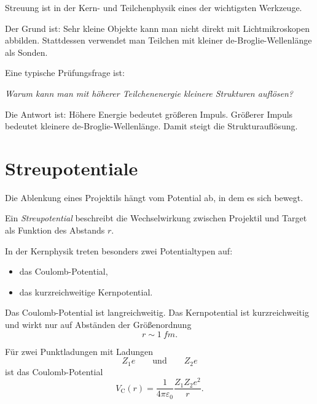 \begin{conceptbox}
Streuung ist in der Kern- und Teilchenphysik eines der wichtigsten Werkzeuge.

Der Grund ist:
Sehr kleine Objekte kann man nicht direkt mit Lichtmikroskopen abbilden.
Stattdessen verwendet man Teilchen mit kleiner de-Broglie-Wellenlänge als Sonden.
\end{conceptbox}

\begin{examtipbox}
Eine typische Prüfungsfrage ist:
\begin{center}
\emph{Warum kann man mit höherer Teilchenenergie kleinere Strukturen auflösen?}
\end{center}
Die Antwort ist:
Höhere Energie bedeutet größeren Impuls.
Größerer Impuls bedeutet kleinere de-Broglie-Wellenlänge.
Damit steigt die Strukturauflösung.
\end{examtipbox}

\section{Streupotentiale}

Die Ablenkung eines Projektils hängt vom Potential ab, in dem es sich bewegt.

\begin{definitionbox}
Ein \emph{Streupotential} beschreibt die Wechselwirkung zwischen Projektil und Target
als Funktion des Abstands $r$.
\end{definitionbox}

\begin{conceptbox}
In der Kernphysik treten besonders zwei Potentialtypen auf:

\begin{itemize}
    \item das Coulomb-Potential,
    \item das kurzreichweitige Kernpotential.
\end{itemize}

Das Coulomb-Potential ist langreichweitig.
Das Kernpotential ist kurzreichweitig und wirkt nur auf Abständen der Größenordnung
\[
    r \sim \SI{1}{fm}.
\]
\end{conceptbox}

\begin{formulabox}
Für zwei Punktladungen mit Ladungen
\[
    Z_1e
    \qquad\text{und}\qquad
    Z_2e
\]
ist das Coulomb-Potential
\[
    V_{\mathrm{C}}(r)
    =
    \frac{1}{4\pi\varepsilon_0}
    \frac{Z_1Z_2e^2}{r}.
\]
\end{formulabox}

